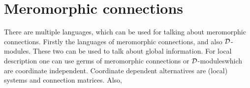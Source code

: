 \chapter{Meromorphic connections}
\begin{comment}
  \begin{multicols}{2}
    \textbf{Global}
    \begin{itemize}
      \item Meromorphic connection
      \item $\cD$-modules (global)
    \end{itemize}
    \columnbreak
    \textbf{Local}
    \begin{itemize}
      \item Germ of a meromorphic connection
      \item $\cD$-modules (local)
      \item System
        \begin{itemize}
          \item coordinate dependent
        \end{itemize}
      \item Conection matrix
        \begin{itemize}
          \item coordinate dependent
        \end{itemize}
    \end{itemize}
  \end{multicols}
\end{comment}
There are multiple languages, which can be used for talking about meromorphic
connections. Firstly the languages of meromorphic connections, and also
$\mathcal{D}$-modules\TODO[global]. These two can be used to talk about global
information. For local description one can use germs of meromorphic connections
or $\mathcal{D}$-modules\TODO[local] which are coordinate independent. Coordinate
dependent alternatives are (local) systems and connection matrices. Also,

\begin{comment}
  Siehe:
  \begin{multicols}{3}
    \begin{itemize}
      \item \cite{boalch} and \cite{thboalch}
      \item \cite{sabbah2007isomonodromic}
      \item \cite{Varadarajan96linearmeromorphic}
      \item \textbf{\cite[Chap.5]{hotta2008}}
    \end{itemize}
    \columnbreak
    Differential modules:
    \begin{itemize}
      \item \cite{Loday1994}
      \item \cite{Loday2014}
    \end{itemize}
  \end{multicols}
\end{comment}

